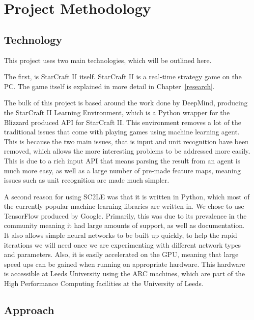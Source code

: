\chapter{Project Methodology}%
\label{method}

\section{Technology}

This project uses two main technologies, which will be outlined here.

The first, is StarCraft II itself. StarCraft II is a real-time strategy game on
the PC\@. The game itself is explained in more detail in
Chapter~\ref{research}.

The bulk of this project is based around the work done by DeepMind, producing
the StarCraft II Learning Environment, which is a Python\cite{python-website}
wrapper for the Blizzard produced API for StarCraft II\cite{bliz-api}. This
environment removes a lot of the traditional issues that come with playing
games using machine learning agent. This is because the two main issues, that
is input and unit recognition have been removed, which allows the more interesting
problems to be addressed more easily. This is due to a rich input API that means
parsing the result from an agent is much more easy, as well as a large number
of pre-made feature maps, meaning issues such as unit recognition are made much
simpler.

A second reason for using SC2LE was that it is written in Python, which most
of the currently popular machine learning libraries are written in. We chose to
use TensorFlow\cite{abadi2016tensorflow} produced by Google. Primarily,
this was due to its prevalence in the community meaning it had large amounts of
support, as well as documentation. It also allows simple neural networks to be
built up quickly, to help the rapid iterations we will need once we are experimenting
with different network types and parameters. Also, it is easily accelerated on the
GPU, meaning that large speed ups can be gained when running on appropriate hardware.
This hardware is accessible at Leeds University using the ARC machines, which are
part of the High Performance Computing facilities at the University
of Leeds\cite{arc}.

\section{Approach}

